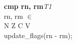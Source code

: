


\begin{instructionblock}{\imagewidth}%
    \textbf{cmp rn, rm}\hfill\textit{T1}\\
    rn, rm $\in$ \baseregisters\\
    {N Z C V}\\
    update\_flags(rn - rm);
\end{instructionblock}

